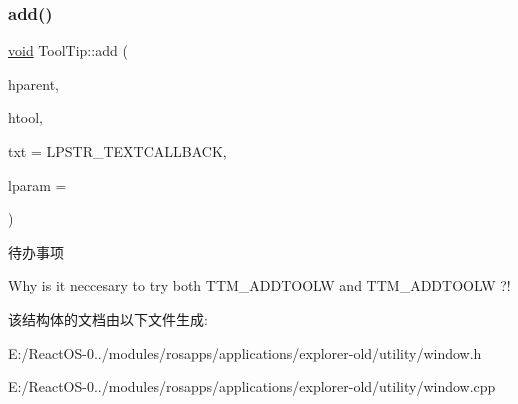 \subsubsection{\texorpdfstring{add()}{add()}}
{\footnotesize\ttfamily \hyperlink{interfacevoid}{void} Tool\+Tip\+::add (\begin{DoxyParamCaption}\item[{\hyperlink{interfacevoid}{H\+W\+ND}}]{hparent,  }\item[{\hyperlink{interfacevoid}{H\+W\+ND}}]{htool,  }\item[{L\+P\+C\+T\+S\+TR}]{txt = {\ttfamily LPSTR\+\_\+TEXTCALLBACK},  }\item[{L\+P\+A\+R\+AM}]{lparam = {} }\end{DoxyParamCaption})\hspace{0.3cm}{\ttfamily [inline]}}

\begin{DoxyRefDesc}{待办事项}
\item[\hyperlink{todo__todo000087}{待办事项}]Why is it neccesary to try both T\+T\+M\+\_\+\+A\+D\+D\+T\+O\+O\+LW and T\+T\+M\+\_\+\+A\+D\+D\+T\+O\+O\+LW ?! \end{DoxyRefDesc}


该结构体的文档由以下文件生成\+:\begin{DoxyCompactItemize}
\item 
E\+:/\+React\+O\+S-\/0../modules/rosapps/applications/explorer-\/old/utility/window.\+h\item 
E\+:/\+React\+O\+S-\/0../modules/rosapps/applications/explorer-\/old/utility/window.\+cpp\end{DoxyCompactItemize}

